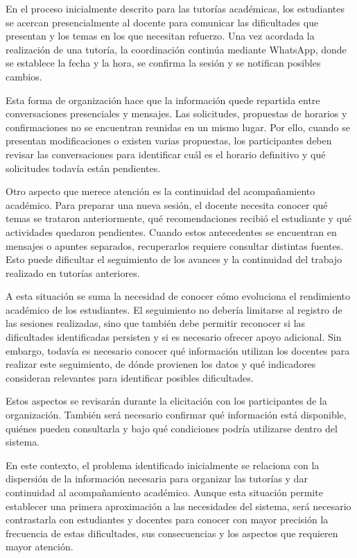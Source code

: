 \documentclass[11pt,a4paper]{article}
\begin{document}
En el proceso inicialmente descrito para las tutorías académicas,
los estudiantes se acercan presencialmente al docente para comunicar
las dificultades que presentan y los temas en los que necesitan
refuerzo. Una vez acordada la realización de una tutoría, la
coordinación continúa mediante WhatsApp, donde se establece la
fecha y la hora, se confirma la sesión y se notifican posibles
cambios.

Esta forma de organización hace que la información quede repartida
entre conversaciones presenciales y mensajes. Las solicitudes,
propuestas de horarios y confirmaciones no se encuentran reunidas
en un mismo lugar. Por ello, cuando se presentan modificaciones
o existen varias propuestas, los participantes deben revisar las
conversaciones para identificar cuál es el horario definitivo
y qué solicitudes todavía están pendientes.

Otro aspecto que merece atención es la continuidad del acompañamiento
académico. Para preparar una nueva sesión, el docente necesita
conocer qué temas se trataron anteriormente, qué recomendaciones
recibió el estudiante y qué actividades quedaron pendientes.
Cuando estos antecedentes se encuentran en mensajes o apuntes
separados, recuperarlos requiere consultar distintas fuentes.
Esto puede dificultar el seguimiento de los avances y la continuidad
del trabajo realizado en tutorías anteriores.

A esta situación se suma la necesidad de conocer cómo evoluciona
el rendimiento académico de los estudiantes. El seguimiento no
debería limitarse al registro de las sesiones realizadas, sino
que también debe permitir reconocer si las dificultades identificadas
persisten y si es necesario ofrecer apoyo adicional. Sin embargo,
todavía es necesario conocer qué información utilizan los docentes
para realizar este seguimiento, de dónde provienen los datos y
qué indicadores consideran relevantes para identificar posibles
dificultades.

Estos aspectos se revisarán durante la elicitación con los
participantes de la organización. También será necesario confirmar
qué información está disponible, quiénes pueden consultarla y
bajo qué condiciones podría utilizarse dentro del sistema.

En este contexto, el problema identificado inicialmente se relaciona
con la dispersión de la información necesaria para organizar las
tutorías y dar continuidad al acompañamiento académico. Aunque
esta situación permite establecer una primera aproximación a las
necesidades del sistema, será necesario contrastarla con estudiantes
y docentes para conocer con mayor precisión la frecuencia de estas
dificultades, sus consecuencias y los aspectos que requieren mayor
atención.
\end{document}
